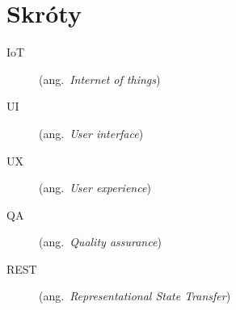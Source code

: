 \chapter*{Skróty}\mbox{}
\label{sec:skroty}
\noindent
\begin{description}
    \item [IoT] (ang.\ \emph{Internet of things}) 
    \item [UI] (ang.\ \emph{User interface}) 
    \item [UX] (ang.\ \emph{User experience}) 
    \item [QA] (ang.\ \emph{Quality assurance})
    \item [REST] (ang.\ \emph{Representational State Transfer})
\end{description}
